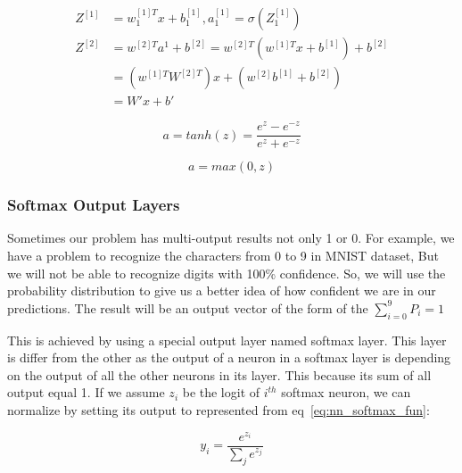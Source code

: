 

\begin{subequations}\label{eq_linear_fun_limitations}
   \begin{align}
     Z^{[1]} & = w_1^{[1]T} x + b_1^{[1]} , a_1^{[1]} = \sigma(Z_1^{[1]}) \\
     Z^{[2]} & = w^{[2]T} a^1 + b^{[2]} = w^{[2]T} (w^{[1]T}x + b^{[1]}) + b^{[2]}\\
             & = (w^{[1]T}W^{[2]T})x + (w^{[2]}b^{[1]}+ b^{[2]})\\
             & = W' x + b'
\end{align}
\end{subequations}



 
\begin{equation}\label{eq:nn_tanh}
  a = tanh(z) =\frac{e^z-e^{-z}}{e^z+e^{-z}}
\end{equation}%



\begin{equation}\label{eq:nn_relu}
  a = max (0,z)
\end{equation}%

\subsubsection{Softmax Output Layers}
Sometimes our problem has multi-output results not only 1 or 0. For example, we have a problem to recognize the characters from 0 to 9 in MNIST dataset, But we will not be able to recognize digits with 100\% confidence. So, we will use the probability distribution to give us a better idea of how confident we are in our predictions. The result will be an output vector of the form of the $\sum_{i = 0}^9P_i=1$

This is achieved by using a special output layer named softmax layer. This layer is differ from the other as the output of a neuron in a softmax layer is depending on the output of all the other neurons in its layer. This because its sum of all output equal 1. If we assume $z_i$ be the logit of $i^{th}$ softmax neuron, we can normalize by setting its output to represented from eq~\eqref{eq:nn_softmax_fun}:

\begin{equation}\label{eq:nn_softmax_fun}
  y_i=\frac{e^{z_i}}{\sum_je^{z_j}}
\end{equation}

